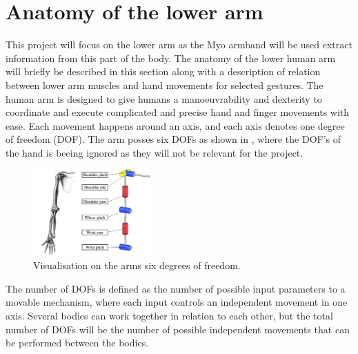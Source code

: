 \section{Anatomy of the lower arm}


This project will focus on the lower arm as the Myo armband will be used extract information from this part of the body. The anatomy of the lower human arm will briefly be described in this section along with a description of relation between lower arm muscles and hand movements for selected gestures.
The human arm is designed to give humans a manoeuvrability and dexterity to coordinate and execute complicated and precise hand and finger movements with ease. Each movement happens around an axis, and each axis denotes one degree of freedom (DOF). The arm posses six DOFs as shown in , where the DOF's of the hand is beeing ignored as they will not be relevant for the project.

\begin{figure}[H]                                         %
	\includegraphics[width=0.4\textwidth]{figures/anatomy/human_arm_dof}  %
	\caption{Visualisation on the arms six degrees of freedom. \cite{ahmed2017}}
	\label{fig:armDOF}  %
\end{figure}

The number of DOFs is defined as the number of possible input parameters to a movable mechanism, where each input controls an independent movement in one axis. Several bodies can work together in relation to each other, but the total number of DOFs will be the number of possible independent movements that can be performed between the bodies. \cite{dicker2003}

